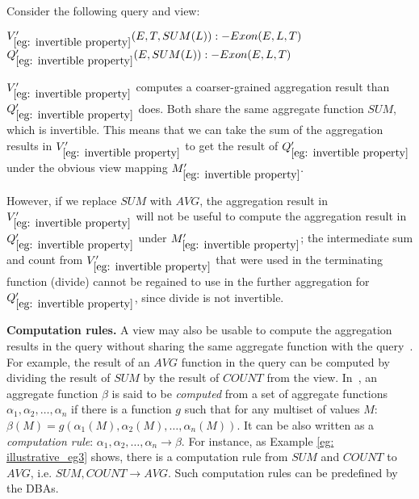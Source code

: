 \begin{example} \label{eg: invertible property}
Consider the following query and view:
\begin{tabbing}
$V_{\ref{eg: invertible property}}'(E, T, SUM(L)) :- Exon(E, L, T)$\\
$Q_{\ref{eg: invertible property}}'(E, SUM(L)) :- Exon(E, L, T)$
\end{tabbing}

$V_{\ref{eg: invertible property}}'$ computes a coarser-grained aggregation result than $Q_{\ref{eg: invertible property}}'$ does. Both %
share the same aggregate function $SUM$, which is invertible. %
This means that we can take the sum of the aggregation results in $V_{\ref{eg: invertible property}}'$ to get the result of $Q_{\ref{eg: invertible property}}'$ under the obvious view mapping $M_{\ref{eg: invertible property}}'.$%

However, if we replace $SUM$ with $AVG$,
the aggregation result in $V_{\ref{eg: invertible property}}'$ will not be useful to compute the aggregation result in $Q_{\ref{eg: invertible property}}'$ under $M_{\ref{eg: invertible property}}'$;  the intermediate sum and count from $V_{\ref{eg: invertible property}}'$ that were used in the terminating function (divide) cannot be regained to use in the further aggregation for $Q_{\ref{eg: invertible property}}'$, since divide is not invertible.
\end{example}

\textbf{Computation rules.}  
A view may also be usable to compute the aggregation results in the query without sharing the same aggregate function with the query~\cite{cohen2006user}. For example, the result of an $AVG$ function in the query can be computed by dividing the result of $SUM$ by the result of $COUNT$ from the view. In~\cite{cohen2006rewriting}, an aggregate function $\beta$ is said to be {\em computed} from a set of aggregate functions $\alpha_1, \alpha_2, \dots, \alpha_n$ if there is a function $g$ such that for any multiset of values $M$: $\beta(M) = g(\alpha_1(M), \alpha_2(M), \dots, \alpha_n(M))$. It can be also written as a {\em computation rule}: $\alpha_1, \alpha_2, \dots, \alpha_n \rightarrow \beta$. For instance, as Example \ref{eg: illustrative_eg3} shows, there is a computation rule from $SUM$ and $COUNT$ to $AVG$, i.e. $SUM, COUNT \rightarrow AVG$. Such computation rules can be predefined by the DBAs.

